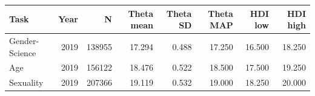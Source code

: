 \begin{tabular}{lrrrrrrr}
\toprule
Task & Year & N & Theta mean & Theta SD & Theta MAP & HDI low & HDI high \\
\midrule
Gender-Science & 2019 & 138955 & 17.294 & 0.488 & 17.250 & 16.500 & 18.250 \\
Age & 2019 & 156122 & 18.476 & 0.522 & 18.500 & 17.500 & 19.250 \\
Sexuality & 2019 & 207366 & 19.119 & 0.532 & 19.000 & 18.250 & 20.000 \\
\bottomrule
\end{tabular}
